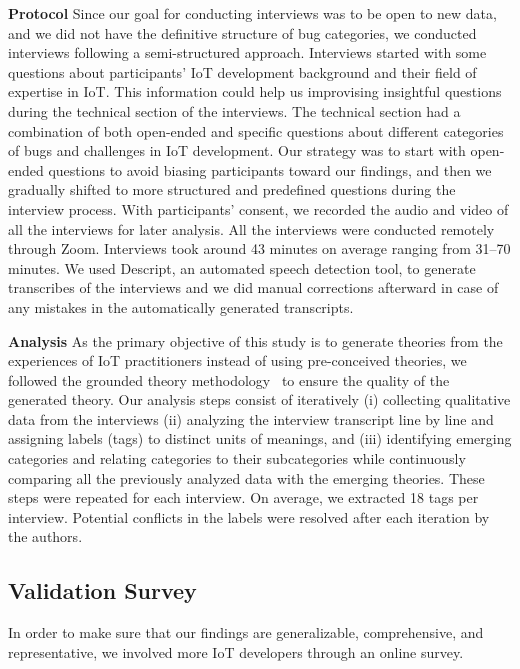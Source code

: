 \textbf{Protocol} \label{interviewProtocol}
Since our goal for conducting interviews was to be open to new data, and we did not have the definitive structure of bug categories, we conducted interviews following a semi-structured approach. Interviews started with some questions about participants' IoT development background and their field of expertise in IoT. This information could help us improvising insightful questions during the technical section of the interviews. The technical section had a combination of both open-ended and specific questions about different categories of bugs and challenges in IoT development. Our strategy was to start with open-ended questions to avoid biasing participants toward our findings, and then we gradually shifted to more structured and predefined questions during the interview process.  With participants' consent, we recorded the audio and video of all the interviews for later analysis. All the interviews were conducted remotely through Zoom. Interviews took around 43 minutes on average ranging from 31--70 minutes. We used Descript, an automated speech detection tool, to generate transcribes of the interviews and we did manual corrections afterward in case of any mistakes in the automatically generated transcripts.

\textbf{Analysis} \label{interviewAnalysis}
As the primary objective of this study is to generate theories from the experiences of IoT practitioners instead of using pre-conceived theories, we followed the grounded theory methodology~\cite{grounded2007} to ensure the quality of the generated theory. Our analysis steps consist of iteratively (i) collecting qualitative data from the interviews (ii)  analyzing the interview transcript line by line and assigning labels (tags) to distinct units of meanings, and (iii) identifying emerging categories and relating categories to their subcategories while continuously comparing all the previously analyzed data with the emerging theories. These steps were repeated for each interview. On average, we extracted 18 tags per interview. Potential conflicts in the labels were resolved after each iteration by the authors. 

\subsection{Validation Survey} \label{survey4bug}
In order to make sure that our findings are generalizable, comprehensive, and representative, we involved more IoT developers through an online survey. 

